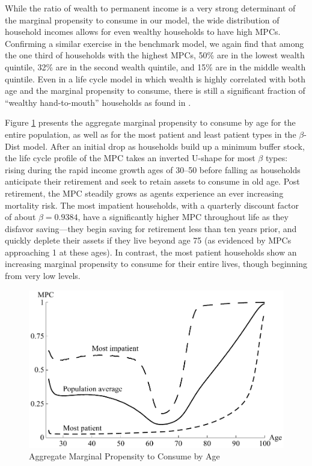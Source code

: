 \documentclass[11pt,a4paper,pdftex]{article}\usepackage[pdftex]{graphicx}\usepackage{epstopdf} \usepackage[pdftex]{hyperref}
\newcommand{\Discount}{\ensuremath{\beta}}
\begin{document}
While the ratio of wealth to permanent income is a very strong determinant of the marginal propensity to consume in our model, the wide distribution of household incomes allows for even wealthy households to have high MPCs.  Confirming a similar exercise in the benchmark model, we again find that among the one third of households with the highest MPCs, 50\% are in the lowest wealth quintile, 32\% are in the second wealth quintile, and 15\% are in the middle wealth quintile.  Even in a life cycle model in which wealth is highly correlated with both age and the marginal propensity to consume, there is still a significant fraction of ``wealthy hand-to-mouth'' households as found in \cite{kaplanViolanteWeidner_wealthyH2M}.

Figure \ref{fig:MPCbyAge} presents the aggregate marginal propensity to consume by age for the entire population, as well as for the most patient and least patient types in the $\Discount$-Dist model.  After an initial drop as households build up a minimum buffer stock, the life cycle profile of the MPC takes an inverted U-shape for most $\Discount$ types: rising during the rapid income growth ages of 30--50 before falling as households anticipate their retirement and seek to retain assets to consume in old age.  Post retirement, the MPC steadily grows as agents experience an ever increasing mortality risk.  The most impatient households, with a quarterly discount factor of about $\beta = 0.9384$, have a significantly higher MPC throughout life as they disfavor saving---they begin saving for retirement less than ten years prior, and quickly deplete their assets if they live beyond age 75 (as evidenced by MPCs approaching 1 at these ages).  In contrast, the most patient households show an increasing marginal propensity to consume for their entire lives, though beginning from very low levels.

\begin{figure}
\caption{Aggregate Marginal Propensity to Consume by Age}
\label{fig:MPCbyAge}
\begin{center}
\includegraphics[scale=0.75]{../Figures/MPCbyAgeFigure.pdf}
\end{center}
\end{figure}
\end{document}
